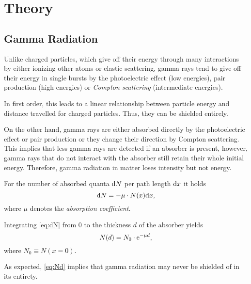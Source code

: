 \chapter{Theory}

\section{Gamma Radiation}
Unlike charged particles, which give off their energy through many interactions by either ionizing other atoms or elastic scattering, gamma rays tend to give off their energy in single bursts by the photoelectric effect (low energies), pair production (high energies) or \textit{Compton scattering} (intermediate energies).

In first order, this leads to a linear relationship between particle energy and distance travelled for charged particles. Thus, they can be shielded entirely.

On the other hand, gamma rays are either absorbed directly by the photoelectric effect or pair production or they change their direction by Compton scattering. This implies that less gamma rays are detected if an absorber is present, however, gamma rays that do not interact with the absorber still retain their whole initial energy. Therefore, gamma radiation in matter loses intensity but not energy.

For the number of absorbed quanta $\text{d} N$ per path length $\text{d} x$ it holds
\begin{equation}\label{eq:dN}
	\text{d} N = -\mu\cdot N(x)\text{d} x,
\end{equation}
where $\mu$ denotes the \textit{absorption coefficient}.

Integrating \autoref{eq:dN} from 0 to the thickness $d$ of the absorber yields
\begin{equation}\label{eq:Nd}
	N(d) = N_0\cdot\mathrm{e}^{-\mu d},
\end{equation}
where $N_0\equiv N(x=0)$.

As expected, \autoref{eq:Nd} implies that gamma radiation may never be shielded of in its entirety.

